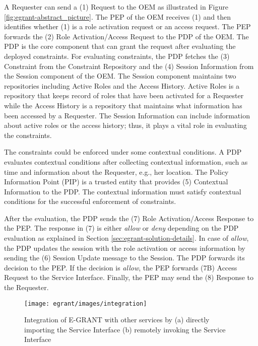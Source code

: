 \documentclass[epsfig,a4paper,11pt,titlepage]{book}
\numberwithin{algorithm}{chapter}
\begin{document}
A Requester can send a (1) Request to the \gls{OEM} as illustrated in Figure \ref{fig:egrant-abstract_picture}. The \gls{PEP} of the \gls{OEM} receives (1) and then identifies whether (1) is a role activation request or an access request. The \gls{PEP} forwards the (2) Role Activation/Access Request to the \gls{PDP} of the \gls{OEM}. The \gls{PDP} is the core component that can grant the request after evaluating the deployed constraints. For evaluating constraints, the \gls{PDP} fetches the (3) Constraint from the Constraint Repository and the (4) Session Information from the Session component of the \gls{OEM}. The Session component maintains two repositories including Active Roles and the Access History. Active Roles is a repository that keeps record of roles that have been activated for a Requester while the Access History is a repository that maintains what information has been accessed by a Requester. The Session Information can include information about active roles or the access history; thus, it plays a vital role in evaluating the constraints.

The constraints could be enforced under some contextual conditions. A \gls{PDP} evaluates contextual conditions after collecting contextual information, such as time and information about the Requester, e.g., her location. The Policy Information Point (\gls{PIP}) is a trusted entity that provides (5) Contextual Information to the \gls{PDP}. The contextual information must satisfy contextual conditions for the successful enforcement of constraints.

After the evaluation, the \gls{PDP} sends the (7) Role Activation/Access Response to the \gls{PEP}. The response in (7) is either \emph{allow} or \emph{deny} depending on the \gls{PDP} evaluation as explained in Section \ref{sec:egrant-solution-details}. In case of \emph{allow}, the \gls{PDP} updates the session with the role activation or access information by sending the (6) Session Update message to the Session. The \gls{PDP} forwards its decision to the \gls{PEP}. If the decision is \emph{allow}, the \gls{PEP} forwards (7B) Access Request to the Service Interface. Finally, the \gls{PEP} may send the (8) Response to the Requester.

\begin{figure} [htp]
\centering
\texttt{[image: egrant/images/integration]}
\caption[Integration of E-GRANT with other services]{Integration of E-GRANT with other services by (a) directly importing the Service Interface (b) remotely invoking the Service Interface}
\label{fig:egrant-integration}
\end{figure}
\end{document}
